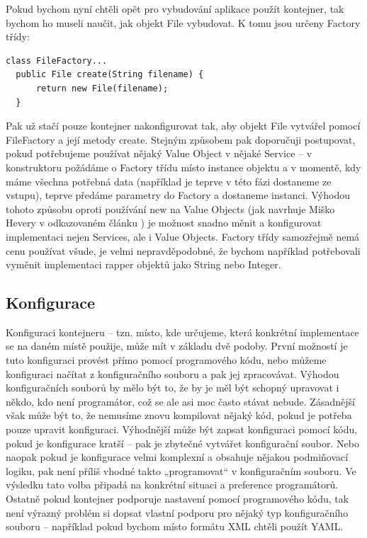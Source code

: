 \documentclass[a4paper,conference]{IEEEtran}
\begin{document}
Pokud bychom nyní chtěli opět pro vybudování aplikace použít kontejner, tak bychom ho museli naučit, jak objekt File vybudovat. K tomu jsou určeny Factory třídy:

\lstset{language=Java, caption=Factory třída pro Value Object, label=listing:Java}
\begin{lstlisting}
class FileFactory...
  public File create(String filename) {
      return new File(filename);
  }
\end{lstlisting}

Pak už stačí pouze kontejner nakonfigurovat tak, aby objekt File vytvářel pomocí FileFactory a její metody create. Stejným způsobem pak doporučuji postupovat, pokud potřebujeme používat nějaký Value Object v nějaké Service – v konstruktoru požádáme o Factory třídu místo instance objektu a v momentě, kdy máme všechna potřebná data (například je teprve v této fázi dostaneme ze vstupu), teprve předáme parametry do Factory a dostaneme instanci. Výhodou tohoto způsobu oproti používání new na Value Objects (jak navrhuje Miško Hevery v odkazovaném článku \cite{How to Think About the new Operator with Respect to Unit Testing}) je možnost snadno měnit a konfigurovat implementaci nejen Services, ale i Value Objects. Factory třídy samozřejmě nemá cenu používat všude, je velmi nepravděpodobné, že bychom například potřebovali vyměnit implementaci rapper objektů jako String nebo Integer.

\subsection{Konfigurace}

Konfiguraci kontejneru – tzn. místo, kde určujeme, která konkrétní implementace se na daném místě použije, může mít v základu dvě podoby. První možností je tuto konfiguraci provést přímo pomocí programového kódu, nebo můžeme konfiguraci načítat z konfiguračního souboru a pak jej zpracovávat.
Výhodou konfiguračních souborů by mělo být to, že by je měl být schopný upravovat i někdo, kdo není programátor, což se ale asi moc často stávat nebude. Zásadnější však může být to, že nemusíme znovu kompilovat nějaký kód, pokud je potřeba pouze upravit konfiguraci.
Výhodnější může být zapsat konfiguraci pomocí kódu, pokud je konfigurace kratší – pak je zbytečné vytvářet konfigurační soubor. Nebo naopak pokud je konfigurace velmi komplexní a obsahuje nějakou podmiňovací logiku, pak není příliš vhodné takto „programovat“ v konfiguračním souboru.
Ve výsledku tato volba připadá na konkrétní situaci a preference programátorů. Ostatně pokud kontejner podporuje nastavení pomocí programového kódu, tak není výrazný problém si dopsat vlastní podporu pro nějaký typ konfiguračního souboru – například pokud bychom místo formátu XML chtěli použít YAML.
\end{document}

